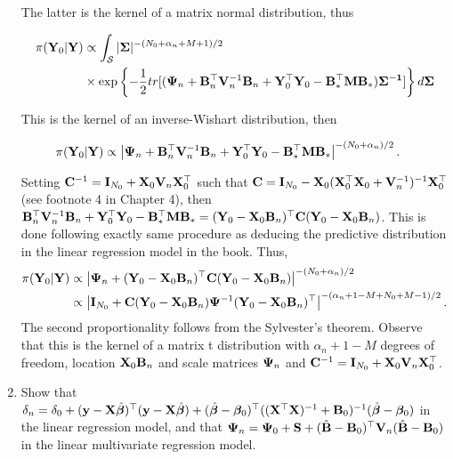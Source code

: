 \begin{enumerate}[leftmargin=*]
The latter is the kernel of a matrix normal distribution, thus

\begin{align*}
	\pi({\bf{Y}}_0|{\bf{Y}})&\propto \int_{\mathcal{S}}|{\bf{\Sigma}}|^{-(N_0+\alpha_n+M+1)/2}\\
	&\times \exp\left\{-\frac{1}{2}tr[({\bf{\Psi}}_n+{\bf{B}}_n^{\top}{\bf{V}}_n^{-1}{\bf{B}}_n+{\bf{Y}}_0^{\top}{\bf{Y}}_0-{\bf{B}}_*^{\top}{\bf{M}}{\bf{B}}_*){\bf{\Sigma}^{-1}}]\right\}d{\bf{\Sigma}}\\
\end{align*}

This is the kernel of an inverse-Wishart distribution, then

\begin{align*}
	\pi({\bf{Y}}_0|{\bf{Y}})&\propto \left|{\bf{\Psi}}_n+{\bf{B}}_n^{\top}{\bf{V}}_n^{-1}{\bf{B}}_n+{\bf{Y}}_0^{\top}{\bf{Y}}_0-{\bf{B}}_*^{\top}{\bf{M}}{\bf{B}}_*\right|^{-(N_0+\alpha_n)/2}.
\end{align*} 

Setting ${\bf{C}}^{-1}={\bf{I}}_{N_0}+{\bf{X}}_0{\bf{V}}_n{\bf{X}}_0^{\top}$ such that ${\bf{C}}={\bf{I}}_{N_0}-{\bf{X}}_0({\bf{X}}_0^{\top}{\bf{X}}_0+{\bf{V}}_n^{-1})^{-1}{\bf{X}}_0^{\top}$ (see footnote 4 in Chapter 4), then ${\bf{B}}_n^{\top}{\bf{V}}_n^{-1}{\bf{B}}_n+{\bf{Y}}_0^{\top}{\bf{Y}}_0-{\bf{B}}_*^{\top}{\bf{M}}{\bf{B}}_*=({\bf{Y}}_0-{\bf{X}}_0{\bf{B}}_n)^{\top}{\bf{C}}({\bf{Y}}_0-{\bf{X}}_0{\bf{B}}_n)$. This is done following exactly same procedure as deducing the predictive distribution in the linear regression model in the book. Thus,
\begin{align*}
	\pi({\bf{Y}}_0|{\bf{Y}})&\propto \left|{\bf{\Psi}}_n+({\bf{Y}}_0-{\bf{X}}_0{\bf{B}}_n)^{\top}{\bf{C}}({\bf{Y}}_0-{\bf{X}}_0{\bf{B}}_n)\right|^{-(N_0+\alpha_n)/2}\\
	&\propto\left|{\bf{I}}_{N_0}+{\bf{C}}({\bf{Y}}_0-{\bf{X}}_0{\bf{B}}_n){\bf{\Psi}}^{-1}({\bf{Y}}_0-{\bf{X}}_0{\bf{B}}_n)^{\top}\right|^{-(\alpha_n+1-M+N_0+M-1)/2}.
\end{align*} 
The second proportionality follows from the Sylvester's theorem. Observe that this is the kernel of a matrix t distribution with $\alpha_n+1-M$ degrees of freedom, location ${\bf{X}}_0{\bf{B}}_n$ and scale matrices ${\bf{\Psi}}_n$ and ${\bf{C}}^{-1}={\bf{I}}_{N_0}+{\bf{X}}_0{\bf{V}}_n{\bf{X}}_0^{\top}$.     

\item Show that $\delta_n=\delta_0+({\bf{y}}-{\bf{X}}\hat{\bm{\beta}})^{\top}({\bf{y}}-{\bf{X}}\hat{\bm{\beta}})+(\hat{\bm{\beta}}-\bm{\beta}_0)^{\top}(({\bf{X}}^{\top}{\bf{X}})^{-1}+{\bf{B}}_0)^{-1}(\hat{\bm{\beta}}-\bm{\beta}_0)$ in the linear regression model, and that ${\bf{\Psi}}_{n}={\bf{\Psi}}_{0}+{\bf{S}}+(\hat{\bf{B}}-{\bf{B}}_{0})^{\top}{\bf{V}}_{n}(\hat{\bf{B}}-{\bf{B}}_{0})$ in the linear multivariate regression model. 


\end{enumerate}
